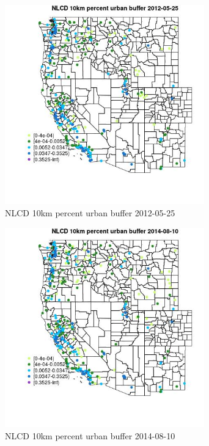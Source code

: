 \begin{figure} 
\centering  
\includegraphics[width=0.77\textwidth]{Code_Outputs/Report_ML_input_PM25_Step4_part_e_de_duplicated_aves_compiled_2019-05-18wNAs_MapObsNLCD_10km_percent_urban_buffer2012-05-25.jpg} 
\caption{\label{fig:Report_ML_input_PM25_Step4_part_e_de_duplicated_aves_compiled_2019-05-18wNAsMapObsNLCD_10km_percent_urban_buffer2012-05-25}NLCD 10km percent urban buffer 2012-05-25} 
\end{figure} 
 

\begin{figure} 
\centering  
\includegraphics[width=0.77\textwidth]{Code_Outputs/Report_ML_input_PM25_Step4_part_e_de_duplicated_aves_compiled_2019-05-18wNAs_MapObsNLCD_10km_percent_urban_buffer2014-08-10.jpg} 
\caption{\label{fig:Report_ML_input_PM25_Step4_part_e_de_duplicated_aves_compiled_2019-05-18wNAsMapObsNLCD_10km_percent_urban_buffer2014-08-10}NLCD 10km percent urban buffer 2014-08-10} 
\end{figure} 
 

